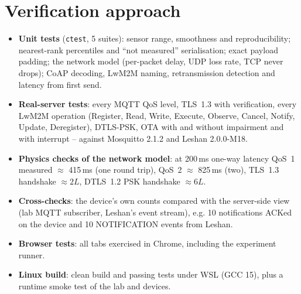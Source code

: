 \documentclass[11pt,a4paper]{article}
\newcommand{\code}[1]{\texttt{#1}}
\begin{document}
\section{Verification approach}
\begin{itemize}
  \item \textbf{Unit tests} (\code{ctest}, 5 suites): sensor range,
        smoothness and reproducibility; nearest-rank percentiles and
        ``not measured'' serialisation; exact payload padding; the network
        model (per-packet delay, UDP loss rate, TCP never drops); CoAP decoding,
        LwM2M naming, retransmission detection and latency from first send.
  \item \textbf{Real-server tests}: every MQTT QoS level, TLS~1.3 with
        verification, every LwM2M operation (Register, Read, Write, Execute,
        Observe, Cancel, Notify, Update, Deregister), DTLS-PSK, OTA with and
        without impairment and with interrupt -- against Mosquitto 2.1.2 and
        Leshan 2.0.0-M18.
  \item \textbf{Physics checks of the network model}: at 200\,ms one-way
        latency QoS~1 measured $\approx$ 415\,ms (one round trip), QoS~2
        $\approx$ 825\,ms (two), TLS~1.3 handshake $\approx 2L$, DTLS~1.2 PSK
        handshake $\approx 6L$.
  \item \textbf{Cross-checks}: the device's own counts compared with the
        server-side view (lab MQTT subscriber, Leshan's event stream), e.g. 10
        notifications ACKed on the device and 10 NOTIFICATION events from
        Leshan.
  \item \textbf{Browser tests}: all tabs exercised in Chrome, including the
        experiment runner.
  \item \textbf{Linux build}: clean build and passing tests under WSL
        (GCC 15), plus a runtime smoke test of the lab and devices.
\end{itemize}

\end{document}
